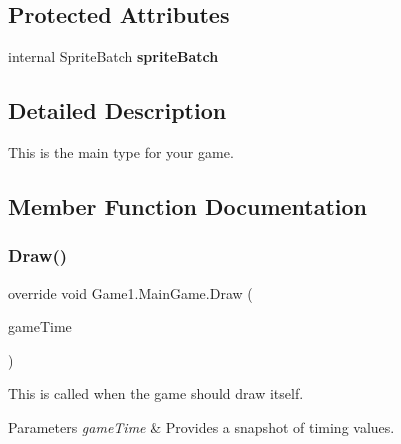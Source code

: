 \subsection*{Protected Attributes}
\begin{DoxyCompactItemize}
\item 
\mbox{\label{class_game1_1_1_main_game_ad1753ce461a413481daf477dc1e069f7}} 
internal Sprite\+Batch {\bfseries sprite\+Batch}
\end{DoxyCompactItemize}


\subsection{Detailed Description}
This is the main type for your game. 



\subsection{Member Function Documentation}
\mbox{\label{class_game1_1_1_main_game_a298cc7007a25f1f61a8bfcbf90885010}} 
\subsubsection{\texorpdfstring{Draw()}{Draw()}}
{\footnotesize\ttfamily override void Game1.\+Main\+Game.\+Draw (\begin{DoxyParamCaption}\item[{Game\+Time}]{game\+Time }\end{DoxyParamCaption})\hspace{0.3cm}{\ttfamily [protected]}}



This is called when the game should draw itself. 


\begin{DoxyParams}{Parameters}
{\em game\+Time} & Provides a snapshot of timing values.\\
\hline
\end{DoxyParams}
\mbox{\label{class_game1_1_1_main_game_aaf3ae9af1f2b8cbce3ef61e48d34f1cc}} 
